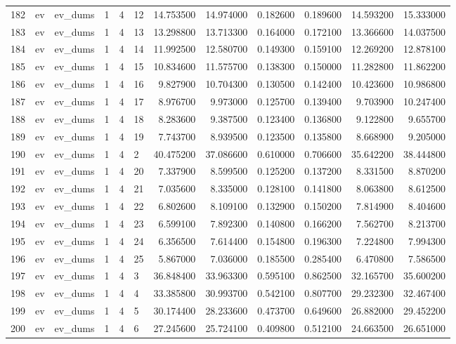 \begin{tabular}{llllllrrrrrr}
182 & ev & ev_dums & 1 & 4 & 12 & 14.753500 & 14.974000 & 0.182600 & 0.189600 & 14.593200 & 15.333000 \\
183 & ev & ev_dums & 1 & 4 & 13 & 13.298800 & 13.713300 & 0.164000 & 0.172100 & 13.366600 & 14.037500 \\
184 & ev & ev_dums & 1 & 4 & 14 & 11.992500 & 12.580700 & 0.149300 & 0.159100 & 12.269200 & 12.878100 \\
185 & ev & ev_dums & 1 & 4 & 15 & 10.834600 & 11.575700 & 0.138300 & 0.150000 & 11.282800 & 11.862200 \\
186 & ev & ev_dums & 1 & 4 & 16 & 9.827900 & 10.704300 & 0.130500 & 0.142400 & 10.423600 & 10.986800 \\
187 & ev & ev_dums & 1 & 4 & 17 & 8.976700 & 9.973000 & 0.125700 & 0.139400 & 9.703900 & 10.247400 \\
188 & ev & ev_dums & 1 & 4 & 18 & 8.283600 & 9.387500 & 0.123400 & 0.136800 & 9.122800 & 9.655700 \\
189 & ev & ev_dums & 1 & 4 & 19 & 7.743700 & 8.939500 & 0.123500 & 0.135800 & 8.668900 & 9.205000 \\
190 & ev & ev_dums & 1 & 4 & 2 & 40.475200 & 37.086600 & 0.610000 & 0.706600 & 35.642200 & 38.444800 \\
191 & ev & ev_dums & 1 & 4 & 20 & 7.337900 & 8.599500 & 0.125200 & 0.137200 & 8.331500 & 8.870200 \\
192 & ev & ev_dums & 1 & 4 & 21 & 7.035600 & 8.335000 & 0.128100 & 0.141800 & 8.063800 & 8.612500 \\
193 & ev & ev_dums & 1 & 4 & 22 & 6.802600 & 8.109100 & 0.132900 & 0.150200 & 7.814900 & 8.404600 \\
194 & ev & ev_dums & 1 & 4 & 23 & 6.599100 & 7.892300 & 0.140800 & 0.166200 & 7.562700 & 8.213700 \\
195 & ev & ev_dums & 1 & 4 & 24 & 6.356500 & 7.614400 & 0.154800 & 0.196300 & 7.224800 & 7.994300 \\
196 & ev & ev_dums & 1 & 4 & 25 & 5.867000 & 7.036000 & 0.185500 & 0.285400 & 6.470800 & 7.586500 \\
197 & ev & ev_dums & 1 & 4 & 3 & 36.848400 & 33.963300 & 0.595100 & 0.862500 & 32.165700 & 35.600200 \\
198 & ev & ev_dums & 1 & 4 & 4 & 33.385800 & 30.993700 & 0.542100 & 0.807700 & 29.232300 & 32.467400 \\
199 & ev & ev_dums & 1 & 4 & 5 & 30.174400 & 28.233600 & 0.473700 & 0.649600 & 26.882000 & 29.452200 \\
200 & ev & ev_dums & 1 & 4 & 6 & 27.245600 & 25.724100 & 0.409800 & 0.512100 & 24.663500 & 26.651000 \\

\end{tabular}
